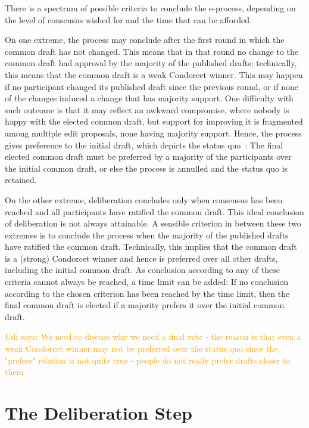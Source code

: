 \documentclass[sigconf]{aamas}  %
\newcommand{\udi}[1]{\textcolor{orange}{Udi says: #1}}
\begin{document}
There is a spectrum of possible criteria to conclude the e-process, depending on the level of consensus wished for and the time that can be afforded.

On one extreme, the process may conclude after the first round in which the common draft has not changed.  This means that in that round no change to the common draft had approval by the majority of the published drafts; technically, this means that the common draft is a weak Condorcet winner.  This may happen if no participant changed its published draft since the previous round, or if none of the changes induced a change that has majority support. One difficulty with such outcome is that it may reflect an awkward compromise, where nobody is happy with the elected common draft, but support for improving it is fragmented among multiple edit proposals, none having majority support.  Hence, the process gives preference to the initial draft, which depicts the status quo~\cite{realsoc}:  The final elected common draft must be preferred by a majority of the participants over the initial common draft, or else the process is annulled and the status quo is retained.

On the other extreme, deliberation concludes only when consensus has been reached and all participants have ratified the common draft.  This ideal conclusion of deliberation is not always attainable.  A sensible criterion in between these two extremes is to conclude the process when the majority of the published drafts have ratified the common draft.  Technically, this implies that the common draft is a (strong) Condorcet winner and hence is preferred over all other drafts, including the initial common draft.  
As conclusion according to any of these criteria cannot always be reached, a time limit can be added:
  If no conclusion according to the chosen criterion has been reached by the time limit, then the final common draft is elected if a majority prefers it over the initial common draft.

\udi{We need to discuss why we need a final vote - the reason is that even a weak Condorcet winner may not be preferred over the status quo since the "prefers" relation is not quite true - people do not really prefer drafts closer to them}

\section{The Deliberation Step}\label{section:deliberation step}
\end{document}
